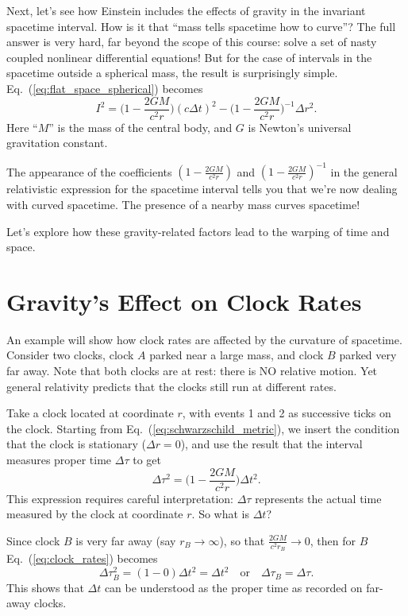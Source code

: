 Next, let's see how Einstein includes the effects of gravity in the
invariant spacetime interval.  How is it that ``mass tells spacetime
how to curve''?  The full answer is very hard, far beyond the scope of
this course: solve a set of nasty coupled nonlinear differential
equations!  But for the case of intervals in the spacetime outside a
spherical mass, the result is surprisingly simple.
Eq.~(\ref{eq:flat_space_spherical}) becomes
\begin{equation}
  I^2 = \biggl(1-\frac{2GM}{c^2 r}\biggr)(c\Delta t)^2-
  \biggl(1-\frac{2GM}{c^2 r}\biggr)^{-1}\Delta r^2. 
\label{eq:schwarzschild_metric}
\end{equation}
Here ``$M$'' is the mass of the central body, and $G$ is Newton's
universal gravitation constant.

The appearance of the coefficients $(1-\frac{2GM}{c^2r})$ and
$(1-\frac{2GM}{c^2r})^{-1}$ in the general relativistic expression for
the spacetime interval tells you that we're now dealing with curved
spacetime.  The presence of a nearby mass curves spacetime!  

Let's explore how these gravity-related factors lead to the warping of
time and space.

\section{Gravity's Effect on Clock Rates}

An example will show how clock rates are affected by the curvature of
spacetime.  Consider two clocks, clock $A$ parked near a large mass,
and clock $B$ parked very far away.  Note that both clocks are at
rest: there is NO relative motion.  Yet general relativity predicts
that the clocks still run at different rates.

Take a clock located at coordinate $r$, with events 1 and 2 as
successive ticks on the clock.  Starting
from Eq.~(\ref{eq:schwarzschild_metric}), we insert the
condition that the clock is stationary ($\Delta r=0$), and use the
result that the interval measures proper time $\Delta\tau$ to get
\begin{equation}
  \Delta\tau^2 = \biggl(1-\frac{2GM}{c^2 r}\biggr)\Delta t^2.
\label{eq:clock_rates}
\end{equation}
This expression requires careful interpretation: $\Delta\tau$ represents
the actual time measured by the clock at coordinate $r$.  So what is
$\Delta t$?

Since clock $B$ is very far away (say $r_B\to\infty$), so that
$\frac{2GM}{c^2r_B}\to 0$, then for $B$
Eq.~(\ref{eq:clock_rates}) becomes
\begin{equation}
  \Delta \tau_B^2 = (1-0)\Delta t^2 = \Delta t^2 \quad\text{or}\quad
  \Delta\tau_B = \Delta\tau.
\end{equation}
This shows that $\Delta t$ can be understood as the proper time as
recorded on far-away clocks.

